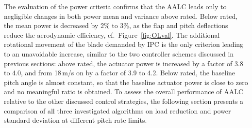  The evaluation of the power criteria confirms that the AALC leads only to negligible changes in both power mean and variance above rated. Below rated, the mean power is decreased by 2\% to 3\%, as the flap and pitch deflections reduce the aerodynamic efficiency, cf.\ Figure~\ref{fig:OLval}. The additional rotational movement of the blade demanded by IPC is the only criterion leading to an unavoidable increase, similar to the two controller schemes discussed in previous sections: above rated, the actuator power is increased by a factor of 3.8 to 4.0, and from 18\,m/s on by a factor of 3.9 to 4.2. Below rated, the baseline pitch angle is almost constant, so that the baseline actuator power is close to zero and no meaningful ratio is obtained. To assess the overall performance of AALC relative to the other discussed control strategies, the following section presents a comparison of all three investigated algorithms on load reduction and  power standard deviation at different pitch rate limits.
